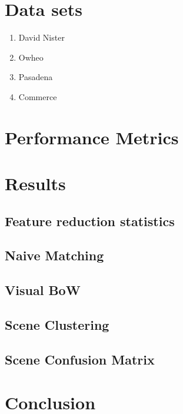 \section{Data sets}
\begin{enumerate}
\item David Nister
\item Owheo
\item Pasadena
\item Commerce
\end{enumerate}
\section{Performance Metrics}
\section{Results}
\subsection{Feature reduction statistics}
\subsection{Naive Matching}
\subsection{Visual BoW}
\subsection{Scene Clustering}
\subsection{Scene Confusion Matrix}
\section{Conclusion}